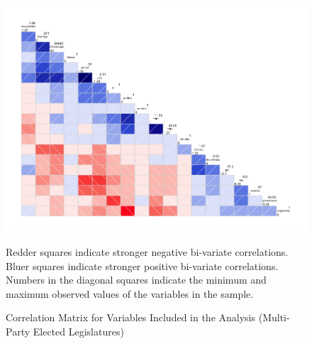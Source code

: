 \documentclass[a4paper]{article}\usepackage[]{graphicx}\usepackage[]{color}
\begin{document}
\begin{landscape}
\begin{figure}[t]
    \caption{Correlation Matrix for Variables Included in the Analysis (Multi-Party Elected Legislatures)}
    \label{corrmatrix}
    \begin{center}
    
    \includegraphics[width = \textwidth]{corScatter.png}  






    \end{center}
    \begin{singlespace}
        {\scriptsize{Redder squares indicate stronger negative bi-variate correlations. \\
        Bluer squares indicate stronger positive bi-variate correlations. \\
        Numbers in the diagonal squares indicate the minimum and maximum observed values of the variables in the sample.
        }}
    \end{singlespace} 
\end{figure}
\end{landscape}

\end{document}
